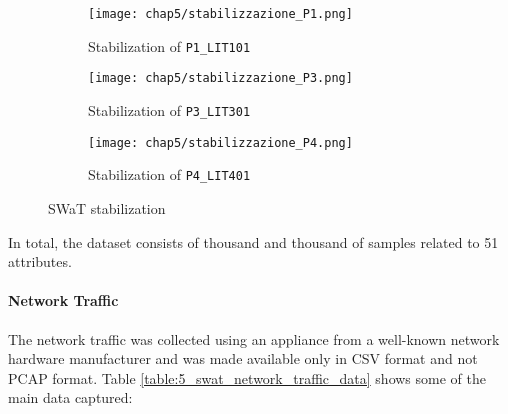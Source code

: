 \begin{figure}[ht]
	\centering
	\begin{subfigure}{0.48\textwidth}
		\texttt{[image: chap5/stabilizzazione\_P1.png]}
		\caption{Stabilization of \texttt{P1\_LIT101}}
		\label{subfig:5_stab_lit101}
	\end{subfigure}
	\hfill
	\begin{subfigure}{0.48\textwidth}
		\texttt{[image: chap5/stabilizzazione\_P3.png]}
		\caption{Stabilization of \texttt{P3\_LIT301}}
		\label{subfig:5_stab_lit301}
	\end{subfigure}
	\begin{subfigure}{0.48\textwidth}
		\texttt{[image: chap5/stabilizzazione\_P4.png]}
		\caption{Stabilization of \texttt{P4\_LIT401}}
		\label{subfig:5_stab_lit401}
	\end{subfigure}
	\caption{SWaT stabilization}
	\label{fig:5_swat_stabilization}
\end{figure}
In total, the dataset consists of thousand and thousand of samples related to 51 attributes.

\paragraph{Network Traffic}
\label{par:5_2015_net_dataset}
The network traffic was collected using an appliance from a well-known network hardware manufacturer and was made available only in CSV format and not PCAP format. Table \ref{table:5_swat_network_traffic_data} shows some of the main data captured:

